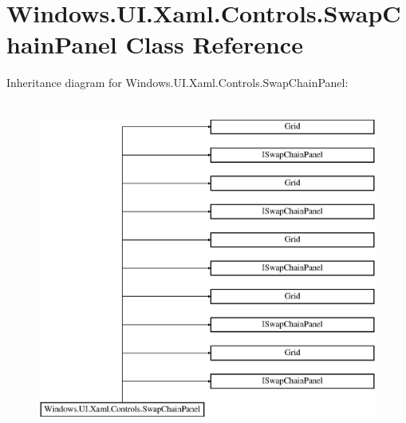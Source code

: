 \hypertarget{class_windows_1_1_u_i_1_1_xaml_1_1_controls_1_1_swap_chain_panel}{}\section{Windows.\+U\+I.\+Xaml.\+Controls.\+Swap\+Chain\+Panel Class Reference}
\label{class_windows_1_1_u_i_1_1_xaml_1_1_controls_1_1_swap_chain_panel}
Inheritance diagram for Windows.\+U\+I.\+Xaml.\+Controls.\+Swap\+Chain\+Panel\+:\begin{figure}[H]
\begin{center}
\leavevmode
\includegraphics[height=11.000000cm]{class_windows_1_1_u_i_1_1_xaml_1_1_controls_1_1_swap_chain_panel}
\end{center}
\end{figure}
